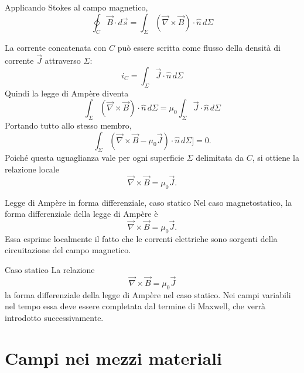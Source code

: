 \documentclass[a4paper]{article}
\begin{document}
Applicando Stokes al campo magnetico,
\[
    \oint_C \vec{B}\cdot d\vec{s}
    =\int_\Sigma \left(\vec{\nabla}\times\vec{B}\right)\cdot\hat{n}\,d\Sigma
\]

La corrente concatenata con \(C\) può essere scritta come flusso della densità di corrente \(\vec{J}\) attraverso \(\Sigma\):
\[
    i_C=\int_\Sigma \vec{J}\cdot\hat{n}\,d\Sigma
\]
Quindi la legge di Ampère diventa
\[
    \int_\Sigma \left(\vec{\nabla}\times\vec{B}\right)\cdot\hat{n}\,d\Sigma
    =\mu_0\int_\Sigma \vec{J}\cdot\hat{n}\,d\Sigma
\]
Portando tutto allo stesso membro,
\[
\int_\Sigma \left(\vec{\nabla}\times\vec{B}-\mu_0\vec{J}\right)\cdot\hat{n}\,d\Sigma]=0.
\]
Poiché questa uguaglianza vale per ogni superficie \(\Sigma\) delimitata da \(C\), si ottiene la relazione locale
\[
\vec{\nabla}\times\vec{B}=\mu_0\vec{J}.
\]

\begin{snippettheorem}{Legge di Ampère in forma differenziale, caso statico}
Nel caso magnetostatico, la forma differenziale della legge di Ampère è
\[
    \vec{\nabla}\times\vec{B}=\mu_0\vec{J}.
\]
Essa esprime localmente il fatto che le correnti elettriche sono sorgenti della circuitazione del campo magnetico.
\end{snippettheorem}

\begin{center}
\end{center}

\begin{snippetnote}{Caso statico}
La relazione
\[
    \vec{\nabla}\times\vec{B}=\mu_0\vec{J}
\]
la forma differenziale della legge di Ampère nel caso statico. Nei campi variabili nel tempo essa deve essere completata dal termine di Maxwell, che verrà introdotto successivamente.
\end{snippetnote}

\pagebreak
\part{Campi nei mezzi materiali}
\end{document}
